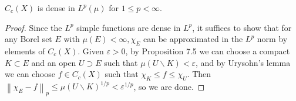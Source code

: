 \documentclass[12pt, a4paper, oneside]{book}
\begin{document}
\begin{proposition}
    \label{pro: C_c(X) is dense in L^p(mu)}
    $C_c(X)$ is dense in $L^p(\mu)$ for $1 \leq p<\infty$.
    \begin{proof}
        Since the $L^p$ simple functions are dense in $L^p$, it suffices to show that for any Borel set $E$ with $\mu(E)<\infty, \chi_E$ can be approximated in
        the $L^p$ norm by elements of $C_c(X)$. Given $\varepsilon>0$, by Proposition 7.5 we can choose a compact $K \subset E$ and an open $U \supset E$ such that $\mu(U \backslash K)<\varepsilon$, and by Urysohn's lemma we can choose $f \in C_c(X)$ such that $\chi_K \leq f \leq \chi_U$. Then $\left\|\chi_E-f\right\|_p \leq \mu(U \backslash K)^{1 / p}<\varepsilon^{1 / p}$, so we are done.
    \end{proof}
\end{proposition}
\end{document}
